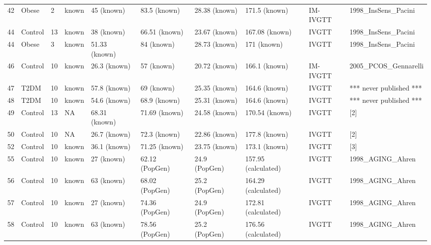 \documentclass[utf8]{frontiersSCNS} %
\begin{document}
\begin{table}[h]
{\begin{tabular}{llllllllll}
42  & Obese   & 2  & known             & 45 (known)         & 83.5 (known)   & 28.38 (known)      & 171.5 (known)       & IM-IVGTT & 1998\_InsSens\_Pacini      \\
44  & Control & 13 & known             & 38 (known)         & 66.51 (known)  & 23.67 (known)      & 167.08 (known)      & IVGTT    & 1998\_InsSens\_Pacini      \\
44  & Obese   & 3  & known             & 51.33 (known)      & 84 (known)     & 28.73 (known)      & 171 (known)         & IVGTT    & 1998\_InsSens\_Pacini      \\
46  & Control & 10 & known             & 26.3 (known)       & 57 (known)     & 20.72 (known)      & 166.1 (known)       & IM-IVGTT & 2005\_PCOS\_Gennarelli     \\
47  & T2DM    & 10 & known             & 57.8 (known)       & 69 (known)     & 25.35 (known)      & 164.6 (known)       & IVGTT    & *** never published ***    \\
48  & T2DM    & 10 & known             & 54.6 (known)       & 68.9 (known)   & 25.31 (known)      & 164.6 (known)       & IVGTT    & *** never published ***    \\
49  & Control & 13 & NA                & 68.31 (known)      & 71.69 (known)  & 24.58 (known)      & 170.54 (known)      & IVGTT    & {[}2{]}                    \\
50  & Control & 10 & NA                & 26.7 (known)       & 72.3 (known)   & 22.86 (known)      & 177.8 (known)       & IVGTT    & {[}2{]}                    \\
52  & Control & 10 & known             & 36.1 (known)       & 71.25 (known)  & 23.75 (known)      & 173.1 (known)       & IVGTT    & {[}3{]}                    \\
55  & Control & 10 & known             & 27 (known)         & 62.12 (PopGen) & 24.9 (PopGen)      & 157.95 (calculated) & IVGTT    & 1998\_AGING\_Ahren         \\
56  & Control & 10 & known             & 63 (known)         & 68.02 (PopGen) & 25.2 (PopGen)      & 164.29 (calculated) & IVGTT    & 1998\_AGING\_Ahren         \\
57  & Control & 10 & known             & 27 (known)         & 74.36 (PopGen) & 24.9 (PopGen)      & 172.81 (calculated) & IVGTT    & 1998\_AGING\_Ahren         \\
58  & Control & 10 & known             & 63 (known)         & 78.56 (PopGen) & 25.2 (PopGen)      & 176.56 (calculated) & IVGTT    & 1998\_AGING\_Ahren         \\

\end{tabular}}
\end{table}
\end{document}
